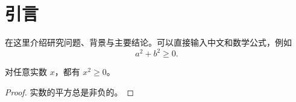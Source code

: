 \section{引言}

在这里介绍研究问题、背景与主要结论。可以直接输入中文和数学公式，例如
\begin{equation}
  a^2+b^2\geq 0.
\end{equation}

\begin{theorem}[平方非负]
对任意实数 $x$，都有 $x^2\geq 0$。
\end{theorem}

\begin{proof}
实数的平方总是非负的。
\end{proof}
